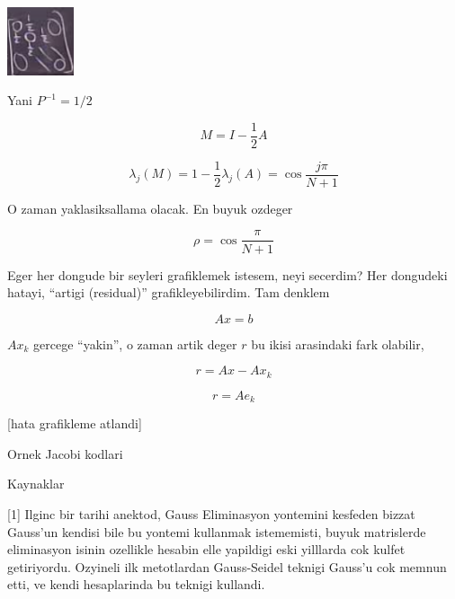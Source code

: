 \documentclass[12pt,fleqn]{article}\usepackage{../common}
\begin{document}
\includegraphics[height=2cm]{15_1.png}

Yani $P^{-1} = 1/2$

\[ M = I-\frac{ 1}{2}A  \]

\[ \lambda_j(M) = 1 - \frac{ 1}{2}\lambda_j(A) = \cos \frac{ j\pi}{N+1}\]

O zaman yaklasiksallama olacak. En buyuk ozdeger

\[ \rho = \cos \frac{ \pi}{N+1} \]

Eger her dongude bir seyleri grafiklemek istesem, neyi secerdim? Her
dongudeki hatayi, ``artigi (residual)'' grafikleyebilirdim. Tam denklem

\[ Ax = b \]

$Ax_k$ gercege ``yakin'', o zaman artik deger $r$ bu ikisi arasindaki fark
olabilir, 

\[ r = Ax - Ax_k \]

\[ r = Ae_k \]

[hata grafikleme atlandi]

Ornek Jacobi kodlari





Kaynaklar

[1] Ilginc bir tarihi anektod, Gauss Eliminasyon yontemini kesfeden bizzat
Gauss'un kendisi bile bu yontemi kullanmak istememisti, buyuk matrislerde
eliminasyon isinin ozellikle hesabin elle yapildigi eski yilllarda cok
kulfet getiriyordu. Ozyineli ilk metotlardan Gauss-Seidel teknigi Gauss'u
cok memnun etti, ve kendi hesaplarinda bu teknigi kullandi.
\end{document}
